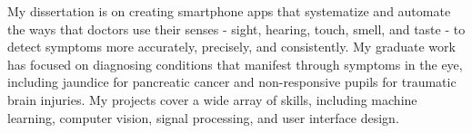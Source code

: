 My dissertation is on creating smartphone apps that systematize and automate the ways that doctors use their senses - sight, hearing, touch, smell, and taste - to detect symptoms more accurately, precisely, and consistently. My graduate work has focused on diagnosing conditions that manifest through symptoms in the eye, including jaundice for pancreatic cancer and non-responsive pupils for traumatic brain injuries. My projects cover a wide array of skills, including machine learning, computer vision, signal processing, and user interface design.